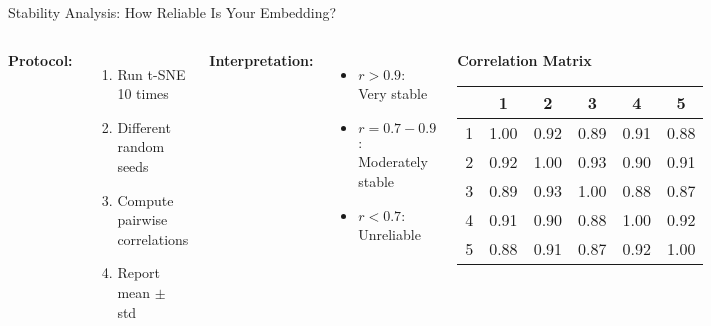 \begin{frame}{Stability Analysis: How Reliable Is Your Embedding?}
\begin{columns}
\textbf{Protocol:}
\begin{enumerate}
\item Run t-SNE 10 times
\item Different random seeds
\item Compute pairwise correlations
\item Report mean $\pm$ std
\end{enumerate}

\textbf{Interpretation:}
\begin{itemize}
\item $r > 0.9$: Very stable
\item $r = 0.7-0.9$: Moderately stable
\item $r < 0.7$: Unreliable
\end{itemize}

\begin{center}
\textbf{Correlation Matrix}\\[0.3cm]
\begin{tabular}{|c|c|c|c|c|c|}
\hline
& 1 & 2 & 3 & 4 & 5 \\
\hline
1 & 1.00 & 0.92 & 0.89 & 0.91 & 0.88 \\
\hline
2 & 0.92 & 1.00 & 0.93 & 0.90 & 0.91 \\
\hline
3 & 0.89 & 0.93 & 1.00 & 0.88 & 0.87 \\
\hline
4 & 0.91 & 0.90 & 0.88 & 1.00 & 0.92 \\
\hline
5 & 0.88 & 0.91 & 0.87 & 0.92 & 1.00 \\
\hline
\end{tabular}
\end{center}
\end{columns}
\end{frame}

